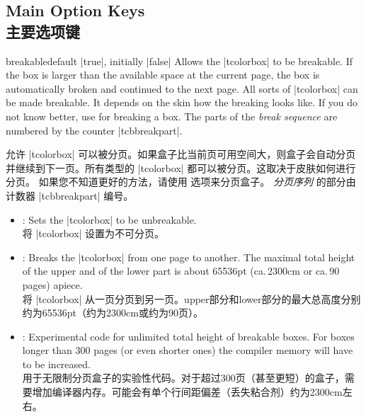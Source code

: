 
\subsection{Main Option Keys\\主要选项键}
\begin{docTcbKey}[][doc updated=2017-02-01]{breakable}{}{default |true|, initially |false|}
Allows the |tcolorbox| to be breakable. If the box is larger than the
available space at the current page, the box is automatically broken
and continued to the next page. All sorts of |tcolorbox| can be made
breakable. It depends on the skin how the breaking looks like.
If you do not know better, use  for breaking a box.
The parts of the \emph{break sequence} are numbered
by the counter |tcbbreakpart|.

允许 |tcolorbox| 可以被分页。如果盒子比当前页可用空间大，则盒子会自动分页并继续到下一页。所有类型的 |tcolorbox| 都可以被分页。这取决于皮肤如何进行分页。 如果您不知道更好的方法，请使用  选项来分页盒子。 \emph{分页序列} 的部分由计数器 |tcbbreakpart| 编号。
\begin{itemize}
\item{}: Sets the |tcolorbox| to be unbreakable.
\\将 |tcolorbox| 设置为不可分页。
\item{}: Breaks the |tcolorbox| from one page to another.
The maximal total height of the upper and of the lower part is
about 65536pt (ca.\,2300cm or ca.\,90 pages) apiece.
\\将 |tcolorbox| 从一页分页到另一页。upper部分和lower部分的最大总高度分别约为65536pt（约为2300cm或约为90页）。
\item{}: Experimental code for unlimited total height of
breakable boxes.
For boxes longer than 300 pages (or even shorter ones) the
compiler memory will have to be increased.
\\用于无限制分页盒子的实验性代码。对于超过300页（甚至更短）的盒子，需要增加编译器内存。可能会有单个行间距偏差（丢失粘合剂）约为2300cm左右。
\end{itemize}

\begin{dispListing}

\begin{tcolorbox}[breakable,title=My breakable box]
\lipsum[1-6]
\end{tcolorbox}
\end{dispListing}
\end{docTcbKey}
{\tcbusetemp}


